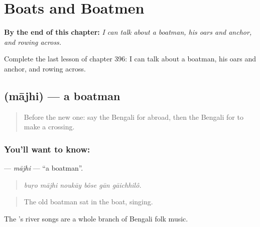 
\chapter{Boats and Boatmen}
\label{ch:bn-boats-and-boatmen}

\begin{chapteropening}
\textbf{By the end of this chapter:} \emph{I can talk about a boatman, his oars and anchor, and rowing across.}

Complete the last lesson of chapter 396: I can talk about a boatman, his oars and anchor, and rowing across.
\end{chapteropening}

\section[\texorpdfstring{\bn{মাঝি} (mājhi)}{মাঝি (mājhi)}]{ (mājhi) — a boatman}

\label{lesson:BN-C396-majhi}



\begin{quote}
Before the new one: say the Bengali for abroad, then the Bengali for to make a crossing.
\end{quote}

\subsection*{You'll want to know: }
\textbf{} — \emph{mājhi} — \textquotedblleft{}a boatman\textquotedblright{}.

\begin{quote}
     
\end{quote}

\begin{quote}
\emph{buṛo mājhi noukāy bôse gān gāichhilô.}
\end{quote}

\begin{quote}
The old boatman sat in the boat, singing.
\end{quote}

The 's river songs are a whole branch of Bengali folk music.

